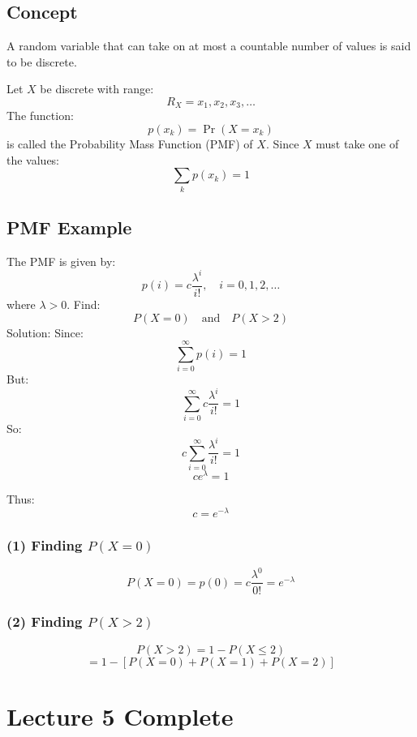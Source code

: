 \documentclass[12pt]{article}
\begin{document}
\subsection{Concept}
A random variable that can take on at most a countable number of values is said to be discrete.

Let $X$ be discrete with range:
\[
R_X=x_1,x_2,x_3,\dots
\]
The function:
\[
p(x_k)=\Pr(X=x_k)
\]
is called the Probability Mass Function (PMF) of $X$.
Since $X$ must take one of the values:
\[
\sum_k p(x_k)=1
\]
\subsection{PMF Example}
The PMF is given by:
\[
p(i)=c\frac{\lambda^i}{i!},\quad i=0,1,2,\dots
\]
where $\lambda>0$.
Find:
\[
P(X=0)
\quad\text{and}\quad
P(X>2)
\]
Solution:
Since:
\[
\sum_{i=0}^{\infty}p(i)=1
\]
But:
\[
\sum_{i=0}^{\infty}c\frac{\lambda^i}{i!}=1
\]
So:
\[
c\sum_{i=0}^{\infty}\frac{\lambda^i}{i!}=1
\]
\[
ce^\lambda=1
\]

Thus:
\[
c=e^{-\lambda}
\]
\subsubsection*{(1) Finding $P(X=0)$}
\[
P(X=0)=p(0)=c\frac{\lambda^0}{0!}=e^{-\lambda}
\]
\subsubsection*{(2) Finding $P(X>2)$}
\[
P(X>2)=1-P(X\le 2)
\]
\[
=1-[P(X=0)+P(X=1)+P(X=2)]
\]
\section*{Lecture 5 Complete}
\end{document}
